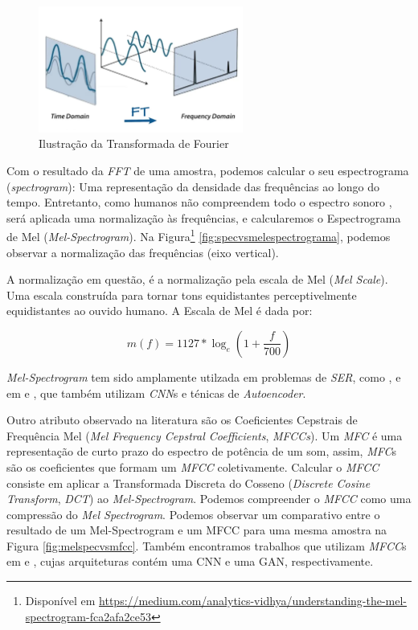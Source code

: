 \begin{figure}[!h]
\centering
\includegraphics[width=0.6\textwidth]{imagens/ft.png}
\caption{\label{fig:fouriertransform}Ilustração da Transformada de Fourier}
\end{figure}

\clearpage

Com o resultado da \textit{FFT} de uma amostra, podemos calcular o seu espectrograma (\textit{spectrogram}): Uma representação da densidade das frequências ao longo do tempo. Entretanto, como humanos não compreendem todo o espectro sonoro \cite{62}, será aplicada uma normalização às frequências, e calcularemos o Espectrograma de Mel (\textit{Mel-Spectrogram}). Na Figura\footnote{Disponível em \url{https://medium.com/analytics-vidhya/understanding-the-mel-spectrogram-fca2afa2ce53}} \ref{fig:specvsmelespectrograma}, podemos observar a normalização das frequências (eixo vertical).

A normalização em questão, é a normalização pela escala de Mel (\textit{Mel Scale}). Uma escala construída para tornar tons equidistantes perceptivelmente equidistantes ao ouvido humano. A Escala de Mel é dada por:

\begin{equation}
    m(f) = 1127 * \log_e{(1 + \frac{f}{700})}
\end{equation}

\textit{Mel-Spectrogram} tem sido amplamente utilzada em problemas de \textit{SER}, como \cite{32.25} \cite{32.30}, e em \cite{32.31} e \cite{32.32}, que também utilizam \textit{CNN}s e ténicas de \textit{Autoencoder}.

Outro atributo observado na literatura são os Coeficientes Cepstrais de Frequência Mel (\textit{Mel Frequency Cepstral Coefficients}, \textit{MFCCs}). Um \textit{MFC} é uma representação de curto prazo do espectro de potência de um som, assim, \textit{MFC}s são os coeficientes que formam um \textit{MFCC} coletivamente. Calcular o \textit{MFCC} consiste em aplicar a Transformada Discreta do Cosseno (\textit{Discrete Cosine Transform}, \textit{DCT}) ao \textit{Mel-Spectrogram}. Podemos compreender o \textit{MFCC} como uma compressão \cite{64} do \textit{Mel Spectrogram}. Podemos observar um comparativo entre o resultado de um Mel-Spectrogram e um MFCC para uma mesma amostra na Figura \ref{fig:melspecvsmfcc}. Também encontramos trabalhos que utilizam \textit{MFCC}s em \cite{32.79} e \cite{32.89}, cujas arquiteturas contém uma CNN e uma GAN, respectivamente.

